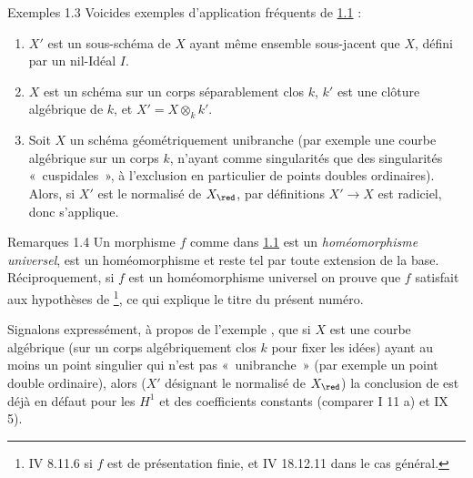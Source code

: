 \documentclass[10pt]{../fichiers-configuration-latex/smfart}
\begin{document}
\begin{enonce*}[remark]{Exemples 1.3}
Voici\pageoriginale  des exemples d'application fréquents de \hyperref[VIII.thm1.1]{1.1} :
\begin{enumerate}
\renewcommand{\theenumi}{\alph{enumi}}
\renewcommand{\labelenumi}{\theenumi)}
\item $X'$ est un sous-schéma de $X$ ayant même ensemble sous-jacent
  que $X$, \ie défini par un nil-Idéal $I$.

\item $X$ est un schéma sur un corps séparablement clos $k$, $k'$ est
  une clôture algébrique de $k$, et $X'= X \otimes_k k'$.

\item Soit $X$ un schéma géométriquement unibranche (par exemple une
  courbe algébrique sur un corps $k$, n'ayant comme singularités que
  des singularités « cuspidales », à l'exclusion en particulier de
  points doubles ordinaires). Alors, si $X'$ est le normalisé de
  $X_{\red}$, par définitions $X'\to X$ est radiciel, donc
   s'applique.
\end{enumerate}
\end{enonce*}

\begin{enonce*}[remark]{Remarques 1.4}
Un morphisme $f$ comme dans \hyperref[VIII.thm1.1]{1.1} est un \emph{homéomorphisme
  universel}, \ie est un homéomorphisme et reste tel par toute
  extension de la base. Réciproquement, si $f$ est un homéomorphisme
  universel on prouve que $f$ satisfait aux hypothèses de 
  \footnote{\Cf \EGA IV 8.11.6 si $f$ est de présentation finie, et \EGA
  IV 18.12.11 dans le cas général.}, ce qui explique le titre du
  présent numéro.

Signalons expressément, à propos de l'exemple ,
que si $X$ est
une courbe algébrique (sur un corps algébriquement clos $k$ pour fixer
les idées) ayant au moins un point singulier qui n'est pas « unibranche » (par exemple un point double ordinaire), alors ($X'$
désignant le normalisé de $X_{\red}$) la conclusion de 
est déjà en
défaut pour les $H^1$ et des coefficients constants (comparer  I
11 a) et  IX 5).
\end{enonce*}
\end{document}

